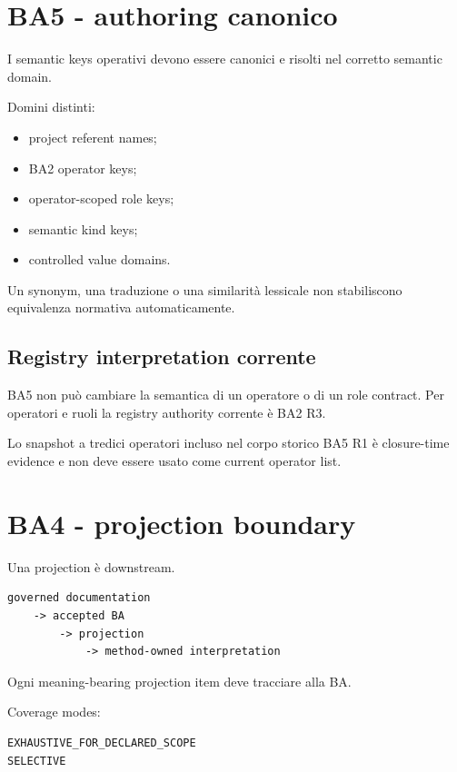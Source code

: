 \documentclass[11pt,a4paper]{article}
\begin{document}
\section{BA5 - authoring canonico}

I semantic keys operativi devono essere canonici e risolti nel corretto semantic domain.

Domini distinti:

\begin{itemize}
\item project referent names;
\item BA2 operator keys;
\item operator-scoped role keys;
\item semantic kind keys;
\item controlled value domains.
\end{itemize}

Un synonym, una traduzione o una similarità lessicale non stabiliscono equivalenza normativa automaticamente.

\subsection{Registry interpretation corrente}

BA5 non può cambiare la semantica di un operatore o di un role contract. Per operatori e ruoli la registry authority corrente è BA2 R3.

Lo snapshot a tredici operatori incluso nel corpo storico BA5 R1 è closure-time evidence e non deve essere usato come current operator list.

\section{BA4 - projection boundary}

Una projection è downstream.

\begin{lstlisting}
governed documentation
    -> accepted BA
        -> projection
            -> method-owned interpretation
\end{lstlisting}

Ogni meaning-bearing projection item deve tracciare alla BA.

Coverage modes:

\begin{lstlisting}
EXHAUSTIVE_FOR_DECLARED_SCOPE
SELECTIVE
\end{lstlisting}
\end{document}
